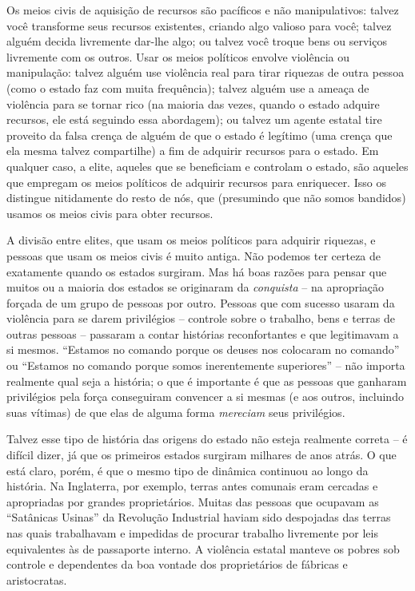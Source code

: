Os meios civis de aquisição de recursos são pacíficos e não manipulativos: talvez você transforme seus recursos existentes, criando algo valioso para você; talvez alguém decida livremente dar-lhe algo; ou talvez você troque bens ou serviços livremente com os outros. Usar os meios políticos envolve violência ou manipulação: talvez alguém use violência real para tirar riquezas de outra pessoa (como o estado faz com muita frequência); talvez alguém use a ameaça de violência para se tornar rico (na maioria das vezes, quando o estado adquire recursos, ele está seguindo essa abordagem); ou talvez um agente estatal tire proveito da falsa crença de alguém de que o estado é legítimo (uma crença que ela mesma talvez compartilhe) a fim de adquirir recursos para o estado. Em qualquer caso, a elite, aqueles que se beneficiam e controlam o estado, são aqueles que empregam os meios políticos de adquirir recursos para enriquecer. Isso os distingue nitidamente do resto de nós, que (presumindo que não somos bandidos) usamos os meios civis para obter recursos.

A divisão entre elites, que usam os meios políticos para adquirir riquezas, e pessoas que usam os meios civis é muito antiga. Não podemos ter certeza de exatamente quando os estados surgiram. Mas há boas razões para pensar que muitos ou a maioria dos estados se originaram da \emph{conquista} -- na apropriação forçada de um grupo de pessoas por outro. Pessoas que com sucesso usaram da violência para se darem privilégios -- controle sobre o trabalho, bens e terras de outras pessoas -- passaram a contar histórias reconfortantes e que legitimavam a si mesmos. ``Estamos no comando porque os deuses nos colocaram no comando'' ou ``Estamos no comando porque somos inerentemente superiores'' -- não importa realmente qual seja a história; o que é importante é que as pessoas que ganharam privilégios pela força conseguiram convencer a si mesmas (e aos outros, incluindo suas vítimas) de que elas de alguma forma \emph{mereciam} seus privilégios.

Talvez esse tipo de história das origens do estado não esteja realmente correta -- é difícil dizer, já que os primeiros estados surgiram milhares de anos atrás. O que está claro, porém, é que o mesmo tipo de dinâmica continuou ao longo da história. Na Inglaterra, por exemplo, terras antes comunais eram cercadas e apropriadas por grandes proprietários. Muitas das pessoas que ocupavam as ``Satânicas Usinas'' da Revolução Industrial haviam sido despojadas das terras nas quais trabalhavam e impedidas de procurar trabalho livremente por leis equivalentes às de passaporte interno. A violência estatal manteve os pobres sob controle e dependentes da boa vontade dos proprietários de fábricas e aristocratas.

